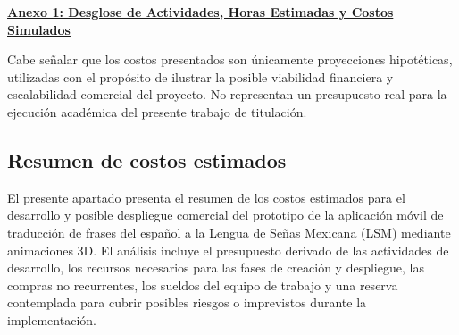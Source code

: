 \begin{flushleft} \href{ruta_del_anexo_o_enlace}{\textbf{Anexo 1: Desglose de Actividades, Horas Estimadas y Costos Simulados}} \end{flushleft}

Cabe señalar que los costos presentados son únicamente proyecciones hipotéticas, utilizadas con el propósito de ilustrar la posible viabilidad financiera y escalabilidad comercial del proyecto. No representan un presupuesto real para la ejecución académica del presente trabajo de titulación.



\subsection{Resumen de costos estimados}

El presente apartado presenta el resumen de los costos estimados para el desarrollo y posible despliegue comercial del prototipo de la aplicación móvil de traducción de frases del español a la Lengua de Señas Mexicana (LSM) mediante animaciones 3D. El análisis incluye el presupuesto derivado de las actividades de desarrollo, los recursos necesarios para las fases de creación y despliegue, las compras no recurrentes, los sueldos del equipo de trabajo y una reserva contemplada para cubrir posibles riesgos o imprevistos durante la implementación.

\begin{table}[H]
	\centering
	\renewcommand{\arraystretch}{1.5}
	\setlength{\tabcolsep}{12pt}
	\caption{Resumen de costos estimados para el desarrollo y despliegue del prototipo}
	\label{tab:costos}
\end{table}

